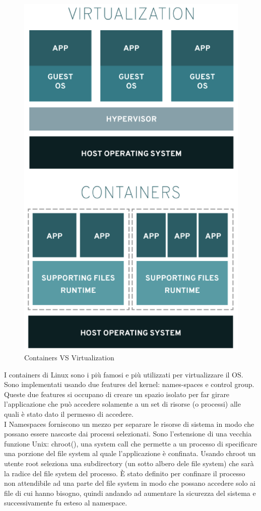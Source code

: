 \documentclass{article}
\begin{document}
\begin{figure}[H]
\centering
\includegraphics[scale=0.4]{img/Virt_tech/21.png}
\caption{Containers VS Virtualization}
\end{figure}
I containers di Linux sono i più famosi e più utilizzati per virtualizzare il OS. Sono implementati usando due features del kernel: names-spaces e control group. Queste due features si occupano di creare un spazio isolato per far girare l'applicazione che può accedere solamente a un set di risorse (o processi) alle quali è stato dato il permesso di accedere.\\
I Namespaces forniscono un mezzo per separare le risorse di sistema in modo che possano essere nascoste dai processi selezionati. Sono l'estensione di una vecchia funzione Unix: chroot(), una system call che permette a un processo di specificare una porzione del file system al quale l'applicazione è confinata. Usando chroot un utente root seleziona una subdirectory (un sotto albero dele file system) che sarà la radice del file system del processo. È stato definito per confinare il processo non attendibile ad una parte del file system in modo che possano accedere solo ai file di cui hanno bisogno, quindi andando ad aumentare la sicurezza del sistema e successivamente fu esteso al namespace. 
\end{document}
